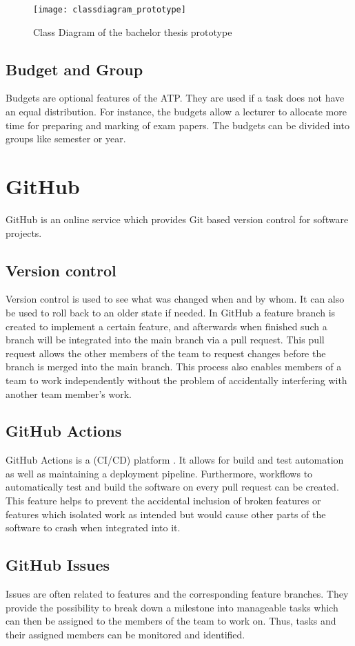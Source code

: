 \begin{figure}[H]
	\centering
	\texttt{[image: classdiagram\_prototype]}
	\caption{Class Diagram of the bachelor thesis prototype}
	\label{classdiagramPrototype}
\end{figure}

\subsection{Budget and Group}
Budgets are optional features of the ATP. They are used if a task does not have an equal distribution. For instance, the budgets allow a lecturer to allocate more time for preparing and marking of exam papers. The budgets can be divided into groups like semester or year.

\section{GitHub} \label{GitHub}
GitHub \cite{github_url} is an online service which provides Git \cite{git_url} based version control for software projects.
\subsection{Version control} \label{Version control}
Version control is used to see what was changed when and by whom. It can also be used to roll back to an older state if needed. In GitHub a feature branch is created to implement a certain feature, and afterwards when finished such a branch will be integrated into the main branch via a pull request. This pull request allows the other members of the team to request changes before the branch is merged into the main branch. This process also enables members of a team to work independently without the problem of accidentally interfering with another team member's work.
\subsection{GitHub Actions} \label{GitHub Actions}
GitHub Actions is a (CI/CD) platform \cite{github_actions_url}. It allows for build and test automation as well as maintaining a deployment pipeline. Furthermore, workflows to automatically test and build the software on every pull request can be created. This feature helps to prevent the accidental inclusion of broken features or features which isolated work as intended but would cause other parts of the software to crash when integrated into it.
\subsection{GitHub Issues} \label{GitHub Issues}
Issues are often related to features and the corresponding feature branches. They provide the possibility to break down a milestone into manageable tasks which can then be assigned to the members of the team to work on. Thus, tasks and their assigned members can be monitored and identified. 

